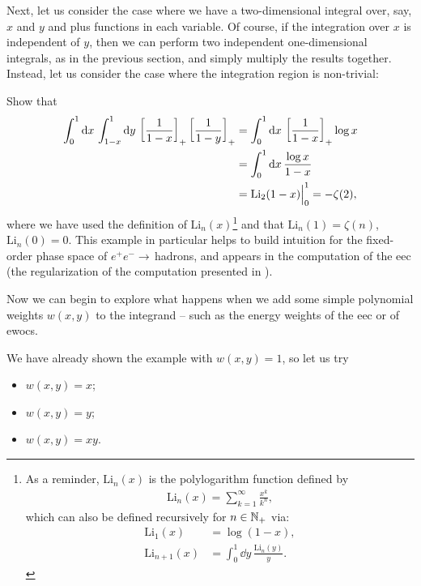 \begin{subappendices}
Next, let us consider the case where we have a two-dimensional integral over, say, \(x\) and \(y\) and plus functions in each variable.
%
Of course, if the integration over \(x\) is independent of \(y\), then we can perform two independent one-dimensional integrals, as in the previous section, and simply multiply the results together.
%
Instead, let us consider the case where the integration region is non-trivial:

\begin{exercise}

    Show that
    \begin{align}
        \int_{0}^{1} \dd x\,
        \int_{1-x}^{1} \dd y\,
        \le[\frac{1}{1-x}\ri]_+
        \le[\frac{1}{1-y}\ri]_+
        &=
        \int_{0}^{1} \dd x\,
        \le[\frac{1}{1-x}\ri]_+
        \log x
        \label{eq:simple_2d}
        \\
        &=
        \int_{0}^{1} \dd x\,
        \frac{\log x}{1-x}
        \notag
        \\
        &= \text{Li}_2(1-x)\Big|^1_0 = -\zeta(2)
        \label{eq:simple_2d_soln}
        ,
    \end{align}
    where we have used the definition of \(\text{Li}_n(x)\)\footnote{
        As a reminder, \(\text{Li}_n(x)\) is the polylogarithm function defined by
        \begin{align}
            \text{Li}_n(x) = \sum_{k=1}^\infty \frac{x^k}{k^n}
            ,
        \end{align}
        which can also be defined recursively for \(n \in \mathbb N_+\) via:
        \begin{align}
            \text{Li}_1(x) &= \log(1-x)
            ,
            \\
            \text{Li}_{n+1}(x) &= \int_0^1 \dd y\, \frac{\text{Li}_n(y)}{y}
            .
        \end{align}
    } and that \(\text{Li}_n(1) = \zeta(n)\), \(\text{Li}_n(0) = 0\).
    This example in particular helps to build intuition for the fixed-order phase space of \(e^+e^-\to\,\)hadrons, and appears in the computation of the \gls{eec} (the regularization of the computation presented in ).
\end{exercise}


Now we can begin to explore what happens when we add some simple polynomial weights \(w(x,y)\) to the integrand -- such as the energy weights of the \gls{eec} or of \glspl{ewoc}.

\begin{example}
We have already shown the example with \(w(x,y) = 1\), so let us try
\begin{itemize}
    \item
        \(w(x,y) = x\);
    \item
        \(w(x,y) = y\);
    \item
        \(w(x,y) = x y\).
\end{itemize}


\end{example}
\end{subappendices}
